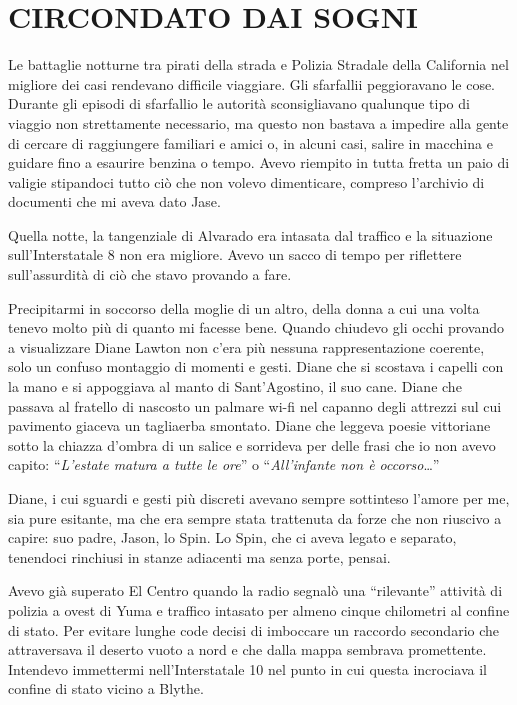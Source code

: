 \chapter{CIRCONDATO DAI SOGNI}\label{circondato-dai-sogni}

\hfill\break

Le battaglie notturne tra pirati della strada e Polizia Stradale della
California nel migliore dei casi rendevano difficile viaggiare. Gli
sfarfallii peggioravano le cose. Durante gli episodi di sfarfallio le
autorità sconsigliavano qualunque tipo di viaggio non strettamente
necessario, ma questo non bastava a impedire alla gente di cercare di
raggiungere familiari e amici o, in alcuni casi, salire in macchina e
guidare fino a esaurire benzina o tempo. Avevo riempito in tutta fretta
un paio di valigie stipandoci tutto ciò che non volevo dimenticare,
compreso l'archivio di documenti che mi aveva dato Jase.

Quella notte, la tangenziale di Alvarado era intasata dal traffico e la
situazione sull'Interstatale 8 non era migliore. Avevo un sacco di tempo
per riflettere sull'assurdità di ciò che stavo provando a fare.

Precipitarmi in soccorso della moglie di un altro, della donna a cui una
volta tenevo molto più di quanto mi facesse bene. Quando chiudevo gli
occhi provando a visualizzare Diane Lawton non c'era più nessuna
rappresentazione coerente, solo un confuso montaggio di momenti e gesti.
Diane che si scostava i capelli con la mano e si appoggiava al manto di
Sant'Agostino, il suo cane. Diane che passava al fratello di nascosto un
palmare wi-fi nel capanno degli attrezzi sul cui pavimento giaceva un
tagliaerba smontato. Diane che leggeva poesie vittoriane sotto la
chiazza d'ombra di un salice e sorrideva per delle frasi che io non
avevo capito: ``\emph{L'estate matura a tutte le ore}'' o
``\emph{All'infante non è occorso}\ldots''

Diane, i cui sguardi e gesti più discreti avevano sempre sottinteso
l'amore per me, sia pure esitante, ma che era sempre stata trattenuta da
forze che non riuscivo a capire: suo padre, Jason, lo Spin. Lo Spin, che
ci aveva legato e separato, tenendoci rinchiusi in stanze adiacenti ma
senza porte, pensai.

Avevo già superato El Centro quando la radio segnalò una ``rilevante''
attività di polizia a ovest di Yuma e traffico intasato per almeno
cinque chilometri al confine di stato. Per evitare lunghe code decisi di
imboccare un raccordo secondario che attraversava il deserto vuoto a
nord e che dalla mappa sembrava promettente. Intendevo immettermi
nell'Interstatale 10 nel punto in cui questa incrociava il confine di
stato vicino a Blythe.

